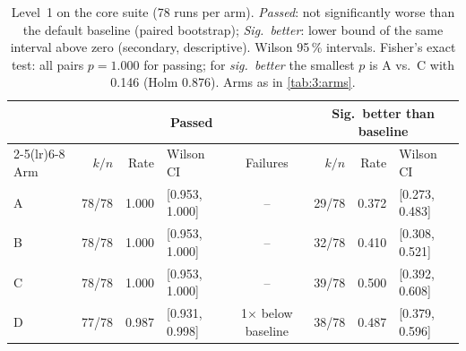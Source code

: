 \begin{table}[htbp]
  \centering
  \small
  \caption[Level 1 on the core suite]{Level~1 on the core suite (78 runs per arm). \emph{Passed}: not significantly worse than the default baseline (paired bootstrap); \emph{Sig.\ better}: lower bound of the same interval above zero (secondary, descriptive). Wilson 95\,\% intervals. Fisher's exact test: all pairs $p = 1.000$ for passing; for \emph{sig.\ better} the smallest $p$ is A vs.\ C with 0.146 (Holm 0.876). Arms as in \autoref{tab:3:arms}.}
  \label{tab:6:passrates}
  \begin{tabular}{lrrlcrrl}
    \toprule
     & \multicolumn{4}{c}{Passed} & \multicolumn{3}{c}{Sig.\ better than baseline} \\
    \cmidrule(lr){2-5}\cmidrule(lr){6-8}
    Arm & $k/n$ & Rate & Wilson CI & Failures & $k/n$ & Rate & Wilson CI \\
    \midrule
    A & 78/78 & 1.000 & [0.953, 1.000] & -- & 29/78 & 0.372 & [0.273, 0.483] \\
    B & 78/78 & 1.000 & [0.953, 1.000] & -- & 32/78 & 0.410 & [0.308, 0.521] \\
    C & 78/78 & 1.000 & [0.953, 1.000] & -- & 39/78 & 0.500 & [0.392, 0.608] \\
    D & 77/78 & 0.987 & [0.931, 0.998] & 1$\times$ below baseline & 38/78 & 0.487 & [0.379, 0.596] \\
    \bottomrule
  \end{tabular}
\end{table}
